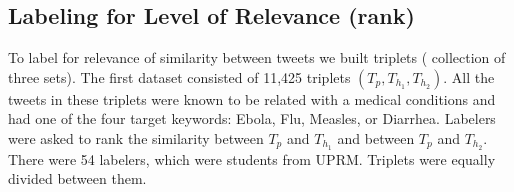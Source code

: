 \documentclass[12pt]{report}
\begin{document}
\subsection{Labeling for Level of Relevance (rank)} \label{data_relevance_labeling}

To label for relevance of similarity between tweets we built triplets ( collection of three sets). The first  dataset consisted of  11,425 triplets $(T_p, T_{h_1}, T_{h_2})$. All the tweets in these triplets were known to 
be related with a medical conditions and had one of the four target keywords: Ebola, Flu, Measles, or Diarrhea.
Labelers were asked to rank the similarity between $T_p$ and $T_{h_1}$ and between $T_p$ and $T_{h_2}$.
There were 54 labelers, which were students from UPRM. Triplets were equally divided between them.  



\end{document}
